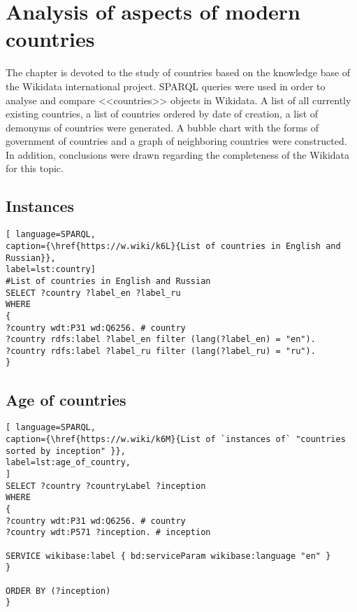 \setchapterpreamble[u]{\margintoc}
\chapter{Analysis of aspects of modern countries\protect\footnotemark}


The chapter is devoted to the study of countries based on the knowledge base of the Wikidata international project. SPARQL queries were used in order to analyse and compare <<countries>> objects in Wikidata. A list of all currently existing countries, a list of countries ordered by date of creation, a list of demonyms of countries were generated. A bubble chart with the forms of government of countries and a graph of neighboring countries were constructed. In addition, conclusions were drawn regarding the completeness of the Wikidata for this topic.

\section{Instances}

\begin{lstlisting}[ language=SPARQL, 
caption={\href{https://w.wiki/k6L}{List of countries in English and Russian}},
label=lst:country]
#List of countries in English and Russian
SELECT ?country ?label_en ?label_ru
WHERE
{
?country wdt:P31 wd:Q6256. # country
?country rdfs:label ?label_en filter (lang(?label_en) = "en").
?country rdfs:label ?label_ru filter (lang(?label_ru) = "ru").
}
\end{lstlisting}

\section{Age of countries}

\begin{lstlisting}[ language=SPARQL, 
caption={\href{https://w.wiki/k6M}{List of `instances of` "countries sorted by inception" }},
label=lst:age_of_country, 					
]
SELECT ?country ?countryLabel ?inception
WHERE
{
?country wdt:P31 wd:Q6256. # country
?country wdt:P571 ?inception. # inception

SERVICE wikibase:label { bd:serviceParam wikibase:language "en" }
}

ORDER BY (?inception)
}
\end{lstlisting}


